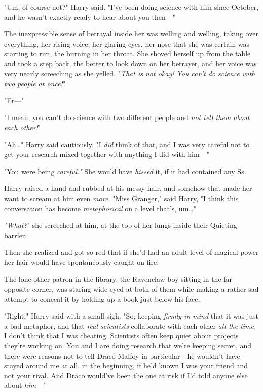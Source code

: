 "Um, of course not?" Harry said. "I've been doing science with him since 
October, and he wasn't exactly ready to hear about you then---"

The inexpressible sense of betrayal inside her was welling and welling, taking 
over everything, her rising voice, her glaring eyes, her nose that she was 
certain was starting to run, the burning in her throat. She shoved herself up 
from the table and took a step back, the better to look down on her betrayer, 
and her voice was very nearly screeching as she yelled, "\emph{That is not 
okay! You can't do science with two people at once!}"

"Er---"

"I mean, you can't do science with two different people and \emph{not tell them 
about each other!}"

"Ah{\ldots}" Harry said cautiously. "I \emph{did} think of that, and I was very 
careful not to get your research mixed together with anything I did with him---"

"You were being \emph{careful."} She would have \emph{hissed} it, if it had 
contained any Ss.

Harry raised a hand and rubbed at his messy hair, and somehow that made her 
want to scream at him even \emph{more.} "Miss Granger," said Harry, "I think 
this conversation has become \emph{metaphorical} on a level that's, um{\ldots}"

\emph{"What?}" she screeched at him, at the top of her lungs inside their 
Quieting barrier.

Then she realized and got so red that if she'd had an adult level of magical 
power her hair would have spontaneously caught on fire.

The lone other patron in the library, the Ravenclaw boy sitting in the far 
opposite corner, was staring wide-eyed at both of them while making a rather 
sad attempt to conceal it by holding up a book just below his face.

"Right," Harry said with a small sigh. "So, keeping \emph{firmly in mind} that 
it was just a bad metaphor, and that \emph{real scientists} collaborate with 
each other \emph{all the time,} I don't think that I was cheating. Scientists 
often keep quiet about projects they're working on. You and I are doing 
research that we're keeping secret, and there were reasons not to tell Draco 
Malfoy in particular---he wouldn't have stayed around me at all, in the 
beginning, if he'd known I was your friend and not your rival. And Draco 
would've been the one at risk if I'd told anyone else about \emph{him}---"

